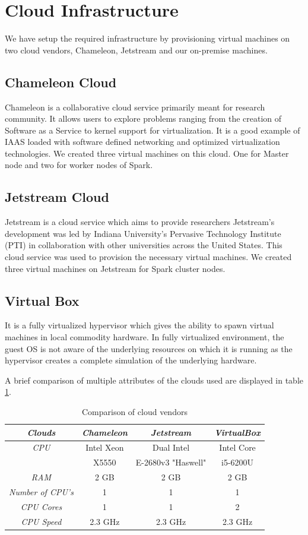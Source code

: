 \documentclass[9pt,twocolumn,twoside]{../../styles/osajnl}
\begin{document}
\section{Cloud Infrastructure}
We have setup the required infrastructure by provisioning virtual machines on two cloud vendors, Chameleon, Jetstream and our on-premise machines.
\subsection{Chameleon Cloud}
Chameleon  is a collaborative cloud service primarily meant for research community. It allows users to explore problems ranging from the creation of Software as a Service to kernel support for virtualization. It is a good example of IAAS loaded with software defined networking and optimized virtualization technologies. We created three virtual machines on this cloud. One for Master node and two for worker nodes of Spark.

\subsection{Jetstream Cloud}
Jetstream is a cloud service which aims to provide researchers Jetstream’s development was led by Indiana University’s Pervasive Technology Institute (PTI) in collaboration with other universities \cite{www-jetstream} across the United States. This cloud service was used to provision the necessary virtual machines. We created three virtual machines on Jetstream for Spark cluster nodes.

\subsection{Virtual Box}
It is a fully virtualized hypervisor which gives the ability to spawn virtual machines in local commodity hardware. In fully virtualized environment, the guest OS  is not aware of the underlying  resources on which it is running as the hypervisor creates a complete simulation of the underlying hardware. 

A brief comparison of multiple attributes of the clouds used are displayed in table \ref{table:clouds}.

\begin{table}[h!]
\centering
 \begin{tabular}{|c|c c c|} 
 \hline
 \textit{Clouds} & \textit{Chameleon} & \textit{Jetstream} & \textit{VirtualBox}  \\ 
 \hline
 \hline 
 \textit{CPU} & Intel Xeon & Dual Intel & Intel Core  \\ 
 & X5550 & E-2680v3 "Haswell" & i5-6200U\\
 \hline 
 \textit{RAM} & 2 GB & 2 GB & 2 GB \\ 
\hline 
\textit{Number of CPU's} & 1 & 1 & 1 \\
\hline 
\textit{CPU Cores} & 1 & 1 & 2\\
\hline 
\textit{CPU Speed} & 2.3 GHz & 2.3 GHz & 2.3 GHz\\
\hline 
\end{tabular}
\caption{Comparison of cloud vendors}
\label{table:clouds}
\end{table}
\end{document}

